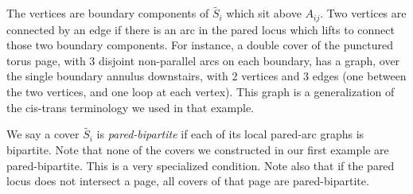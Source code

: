 \documentclass[12pt]{amsart}
\theoremstyle{definition}
\theoremstyle{remark}
\begin{document}
The vertices are boundary components of $\widetilde{S_i}$ which sit above
$A_{ij}$. Two vertices are connected by an edge if there is an arc in the pared
locus which lifts to connect those two boundary components. For instance,
a double cover of the punctured torus page, with 3 disjoint non-parallel arcs
on each boundary, has a graph, over the single boundary annulus downstairs,
with 2 vertices and 3 edges (one between the two vertices, and one loop at each
vertex). This graph is a generalization of the cis-trans terminology we used in
that example.

We say a cover $\widetilde{S_i}$ is \emph{pared-bipartite} if each of its local
pared-arc graphs is bipartite. Note that none of the covers we constructed in
our first example are pared-bipartite. This is a very specialized condition.
Note also that if the pared locus does not intersect a page, all covers of that
page are pared-bipartite.
\end{document}
